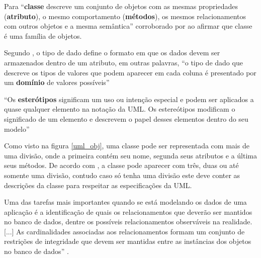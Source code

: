 Para  ``\textbf{classe} descreve um conjunto de 
objetos com as mesmas propriedades (\textbf{atributo}), o mesmo comportamento (\textbf{métodos}), os mesmos relacionamentos com outros objetos e a mesma semântica'' \cite[p.11]{silva2007classesuml} corroborado por  ao afirmar que classe é uma família de objetos. 

Segundo , o tipo de dado define o formato em que os dados devem ser armazenados dentro de um atributo, em outras palavras, ``o tipo de dado que descreve os tipos de valores que podem aparecer em cada coluna é presentado por um \textbf{domínio} de valores possíveis'' \cite[p.39]{navathe2011fundamentals}

``Os \textbf{esterótipos} significam um uso ou intenção especial e podem ser aplicados a quase qualquer elemento na notação da UML. Os estereótipos modificam o significado de um elemento e descrevem o papel desses elementos dentro do seu modelo'' \cite[p.16]{miles2006learning}

Como visto na figura \ref{uml_obj}, uma classe pode ser representada com mais de uma divisão, onde a primeira contém seu nome,  segunda seus atributos e a última seus métodos. De acordo com , a classe pode aparecer com três, duas ou até somente uma divisão, contudo caso só tenha uma divisão este deve conter as descrições da classe para respeitar as especificações da UML.

\begin{citacao}
    Uma das tarefas mais importantes quando se está modelando os dados de uma aplicação é a identificação de quais os relacionamentos que deverão ser mantidos no banco de dados, dentre os possíveis relacionamentos observáveis na realidade. [...] As cardinalidades associadas aos relacionamentos formam um conjunto de restrições de integridade que devem ser mantidas entre as instâncias dos objetos no banco de dados'' \cite[p.22]{lisboa2001modelagem}.
\end{citacao}

